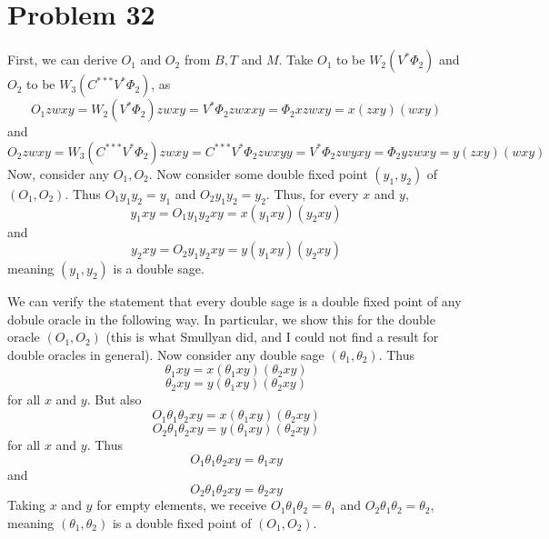 \documentclass{article}
\theoremstyle{definition}
\begin{document}
\section*{Problem 32}
First, we can derive $O_1$ and $O_2$ from $B,T$ and $M$. Take $O_1$ to be $W_2(V^*\Phi_2)$ and $O_2$ to be $W_3(C^{***}V^*\Phi_2)$, as
\[ O_1zwxy=W_2(V^*\Phi_2)zwxy=V^*\Phi_2zwxxy=\Phi_2xzwxy=x(zxy)(wxy) \] and
\[ O_2zwxy=W_3(C^{***}V^*\Phi_2)zwxy=C^{***}V^*\Phi_2zwxyy=V^*\Phi_2zwyxy=\Phi_2yzwxy=y(zxy)(wxy) \]
Now, consider any $O_1,O_2$. Now consider some double fixed point $(y_1,y_2)$ of $(O_1,O_2)$. Thus $O_1y_1y_2=y_1$ and $O_2y_1y_2=y_2$. 
Thus, for every $x$ and $y$, \[ y_1xy=O_1y_1y_2xy=x(y_1xy)(y_2xy) \] and \[ y_2xy=O_2y_1y_2xy=y(y_1xy)(y_2xy) \] meaning 
$(y_1,y_2)$ is a double sage.


We can verify the statement that every double sage is a double fixed point of any dobule oracle in the following way. In particular, we show this for the double oracle 
$(O_1,O_2)$ (this is what Smullyan did, and I could not find a result for double oracles in general).
Now consider any double sage $(\theta_1,\theta_2)$. Thus
\[ \theta_1xy=x(\theta_1xy)(\theta_2xy) \]
\[ \theta_2xy=y(\theta_1xy)(\theta_2xy) \] for all $x$ and $y$. But also
\[ O_1\theta_1\theta_2xy=x(\theta_1xy)(\theta_2xy) \]
\[ O_2\theta_1\theta_2xy=y(\theta_1xy)(\theta_2xy) \] for all $x$ and $y$. Thus
\[ O_1\theta_1\theta_2xy=\theta_1xy \] and \[ O_2\theta_1\theta_2xy=\theta_2xy \]
Taking $x$ and $y$ for empty elements, we receive $O_1\theta_1\theta_2=\theta_1$ and $O_2\theta_1\theta_2=\theta_2$, meaning 
$(\theta_1,\theta_2)$ is a double fixed point of $(O_1,O_2)$.
\end{document}
